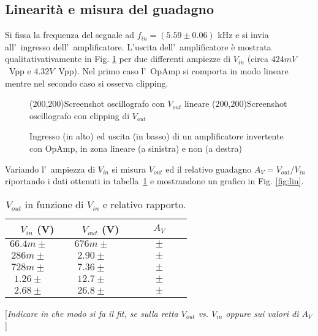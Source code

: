 \documentclass[10pt,a4paper]{article}
\newcommand{\rem}[1]{[\emph{#1}]}
\newcommand{\exn}{\phantom{xxx}}
\begin{document}
\subsection{Linearit\`a e misura del guadagno}
Si fissa la frequenza del segnale ad $f_{in} = (5.59 \pm 0.06)$ kHz e si invia all'~ingresso dell'~amplificatore.
L'uscita dell'~amplificatore \`e mostrata qualitativativamente in Fig. \ref{fig:oscinv} per due 
differenti ampiezze di $V_{in}$ (circa $424mV$~Vpp e $4.32V$~Vpp). 
Nel primo caso l'~OpAmp si comporta in modo lineare mentre nel secondo caso si osserva clipping.   
%
\begin{figure}[h]
\begin{center}
\framebox(200,200){Screenshot oscillografo con $V_{out}$ lineare}
\framebox(200,200){Screenshot oscillografo con clipping di $V_{out}$}
\end{center}
\caption{\small Ingresso (in alto) ed uscita (in basso) di un amplificatore invertente con OpAmp, in 
zona lineare (a sinistra) e non (a destra)}
\label{fig:oscinv}
\end{figure}
%

Variando l'~ampiezza di $V_{in}$ si misura $V_{out}$ ed il relativo guadagno $A_V=V_{out}/V_{in}$ riportando i dati ottenuti in tabella~\ref{tab:guadagno} 
e mostrandone un grafico in Fig. \ref{fig:lin}. 

\begin{table}[h]
\caption{$V_{out}$ in funzione di $V_{in}$ e relativo rapporto.}
\label{tab:guadagno}
\begin{center}
\begin{tabular}{|c|c|c|}
\hline
$V_{in}$ (V) & $V_{out}$ (V)  & $A_V$ \\
\hline
\hline
$66.4m \pm \exn $ & $676m \pm \exn $ & $\exn \pm \exn$ \\
\hline
$286m \pm \exn $ & $2.90 \pm \exn $ & $\exn \pm \exn $ \\
\hline
$728m \pm \exn $ & $7.36 \pm \exn $ & $\exn \pm \exn $ \\
\hline
$1.26 \pm \exn $ & $12.7 \pm \exn $ & $\exn \pm \exn $ \\
\hline
$2.68 \pm \exn $ & $26.8 \pm \exn $ & $\exn \pm \exn $ \\
\hline
\end{tabular}
\end{center}
\end{table}

\rem{Indicare in che modo si fa il fit, se sulla retta $V_{out}$ vs. $V_{in}$ oppure sui valori di $A_V$   }
\end{document}
